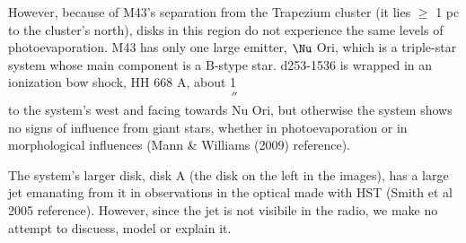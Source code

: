\begin{figure}[htp]
  \hspace*{\fill}%
  \hfill%
  \hspace*{\fill}%
  \label{fig:onc_disk_relations}
\end{figure}


%


However, because of M43's separation from the Trapezium cluster (it lies $\geq$ 1 pc to the cluster's north), disks in this region do not experience the same levels of photoevaporation. M43 has only one large emitter, $\Nu$ Ori, which is a triple-star system whose main component is a B-stype star. d253-1536 is wrapped in an ionization bow shock, HH 668 A, about 1$$''$$ to the system's west and facing towards Nu Ori, but otherwise the system shows no signs of influence from giant stars, whether in photoevaporation or in morphological influences (Mann \& Williams (2009) reference).

The system's larger disk, disk A (the disk on the left in the images), has a large jet emanating from it in observations in the optical made with HST (Smith et al 2005 reference). However, since the jet is not visibile in the radio, we make no attempt to discuess, model or explain it.



